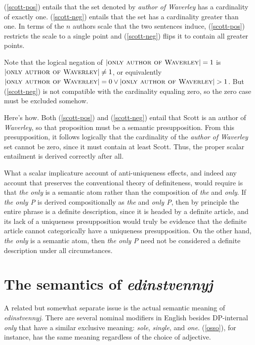 \documentclass{article}
\begin{document}
(\ref{scott-pos}) entails that the set denoted by \textit{author of Waverley} has a cardinality of exactly one. (\ref{scott-neg}) entails that the set has a cardinality greater than one. In terms of the $n$ authors scale that the two sentences induce, (\ref{scott-pos}) restricts the scale to a single point and (\ref{scott-neg}) flips it to contain all greater points.

Note that the logical negation of $|\textsc{only author of Waverley}| = 1$ is
$|\textsc{only author of Waverley}| \ne 1$, or equivalently $|\textsc{only author of Waverley}| = 0 \lor |\textsc{only author of Waverley}| > 1$. But (\ref{scott-neg}) is not compatible with the cardinality equaling zero, so the zero case must be excluded somehow.

Here's how. Both (\ref{scott-pos}) and (\ref{scott-neg}) entail that Scott is an author of \textit{Waverley}, so that proposition must be a semantic presupposition. From this presupposition, it follows logically that the cardinality of the \textit{author of Waverley} set cannot be zero, since it must contain at least Scott. Thus, the proper scalar entailment is derived correctly after all.

What a scalar implicature account of anti-uniqueness effects, and indeed any account that preserves the conventional theory of definiteness, would require is that \textit{the only} is a semantic atom rather than the composition of \textit{the} and \textit{only}. If \textit{the only P} is derived compositionally as \textit{the} and \textit{only P}, then by principle the entire phrase is a definite description, since it is headed by a definite article, and its lack of a uniqueness presupposition would truly be evidence that the definite article cannot categorically have a uniqueness presupposition. On the other hand, \textit{the only} is a semantic atom, then \textit{the only P} need not be considered a definite description under all circumstances. %



\section{The semantics of \textit{edinstvennyj}}
A related but somewhat separate issue is the actual semantic meaning of \textit{edinstvennyj}. There are several nominal modifiers in English besides DP-internal \textit{only} that have a similar exclusive meaning: \textit{sole}, \textit{single}, and \textit{one}. (\ref{osso}), for instance, has the same meaning regardless of the choice of adjective.
\end{document}
